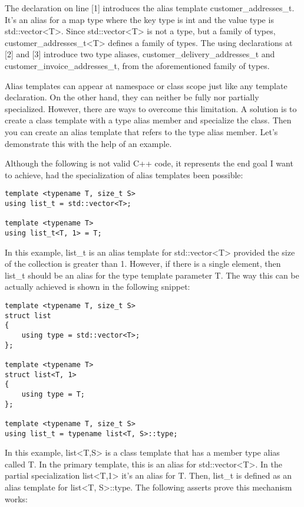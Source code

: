 The declaration on line [1] introduces the alias template customer\_addresses\_t. It's an alias for a map type where the key type is int and the value type is std::vector<T>. Since std::vector<T> is not a type, but a family of types, customer\_addresses\_t<T> defines a family of types. The using declarations at [2] and [3] introduce two type aliases, customer\_delivery\_addresses\_t and customer\_invoice\_addresses\_t, from the aforementioned family of types.

Alias templates can appear at namespace or class scope just like any template declaration. On the other hand, they can neither be fully nor partially specialized. However, there are ways to overcome this limitation. A solution is to create a class template with a type alias member and specialize the class. Then you can create an alias template that refers to the type alias member. Let's demonstrate this with the help of an example.

Although the following is not valid C++ code, it represents the end goal I want to achieve, had the specialization of alias templates been possible:

\begin{lstlisting}[style=styleCXX]
template <typename T, size_t S>
using list_t = std::vector<T>;

template <typename T>
using list_t<T, 1> = T;
\end{lstlisting}

In this example, list\_t is an alias template for std::vector<T> provided the size of the collection is greater than 1. However, if there is a single element, then list\_t should be an alias for the type template parameter T. The way this can be actually achieved is shown in the following snippet:

\begin{lstlisting}[style=styleCXX]
template <typename T, size_t S>
struct list
{
	using type = std::vector<T>;
};

template <typename T>
struct list<T, 1>
{
	using type = T;
};

template <typename T, size_t S>
using list_t = typename list<T, S>::type;
\end{lstlisting}

In this example, list<T,S> is a class template that has a member type alias called T. In the primary template, this is an alias for std::vector<T>. In the partial specialization list<T,1> it's an alias for T. Then, list\_t is defined as an alias template for list<T, S>::type. The following asserts prove this mechanism works:

